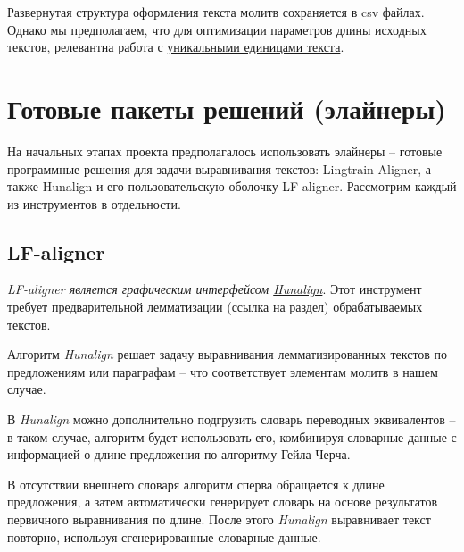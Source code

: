 \documentclass[
  letterpaper,
]{book}
\begin{document}
Развернутая структура оформления текста молитв сохраняется в csv файлах.
Однако мы предполагаем, что для оптимизации параметров длины исходных
текстов, релевантна работа с
\href{https://github.com/Drozhzhinastya/GSPC/tree/main/texts/unique_units}{уникальными
единицами текста}.


\hypertarget{ux433ux43eux442ux43eux432ux44bux435-ux43fux430ux43aux435ux442ux44b-ux440ux435ux448ux435ux43dux438ux439-ux44dux43bux430ux439ux43dux435ux440ux44b}{%
\chapter{\texorpdfstring{\textbf{Готовые пакеты решений
(элайнеры)}}{Готовые пакеты решений (элайнеры)}}\label{ux433ux43eux442ux43eux432ux44bux435-ux43fux430ux43aux435ux442ux44b-ux440ux435ux448ux435ux43dux438ux439-ux44dux43bux430ux439ux43dux435ux440ux44b}}

На начальных этапах проекта предполагалось использовать элайнеры --
готовые программные решения для задачи выравнивания текстов: Lingtrain
Aligner, а также Hunalign и его пользовательскую оболочку LF-aligner.
Рассмотрим каждый из инструментов в отдельности.

\hypertarget{lf-aligner}{%
\section{LF-aligner}\label{lf-aligner}}

\emph{LF-aligner является графическим интерфейсом
\href{https://github.com/danielvarga/hunalign}{Hunalign}}. Этот
инструмент требует предварительной лемматизации (ссылка на раздел)
обрабатываемых текстов.

Алгоритм \emph{Hunalign} решает задачу выравнивания лемматизированных
текстов по предложениям или параграфам -- что соответствует элементам
молитв в нашем случае.

В \emph{Hunalign} можно дополнительно подгрузить словарь переводных
эквивалентов -- в таком случае, алгоритм будет использовать его,
комбинируя словарные данные с информацией о длине предложения по
алгоритму Гейла-Черча.

В отсутствии внешнего словаря алгоритм сперва обращается к длине
предложения, а затем автоматически генерирует словарь на основе
результатов первичного выравнивания по длине. После этого
\emph{Hunalign} выравнивает текст повторно, используя сгенерированные
словарные данные.
\end{document}

